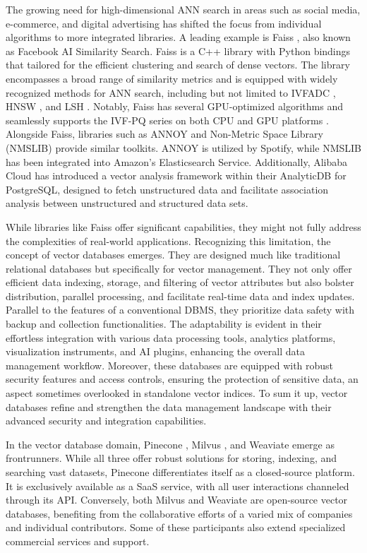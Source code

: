 \documentclass[11pt]{article}
\begin{document}
The growing need for high-dimensional ANN search in areas such as social media, e-commerce, and digital advertising has shifted the focus from individual algorithms to more integrated libraries. A leading example is Faiss \cite{faiss}, also known as Facebook AI Similarity Search.  Faiss is a C++ library with Python bindings that tailored for the efficient clustering and search of dense vectors. The library encompasses a broad range of similarity metrics and is equipped with widely recognized methods for ANN search, including but not limited to IVFADC \cite{DBLP:journals/pami/JegouDS11}, HNSW \cite{DBLP:journals/pami/MalkovY20}, and LSH \cite{e2LSH}. Notably, Faiss has several GPU-optimized algorithms and seamlessly supports the IVF-PQ series on both CPU and GPU platforms \cite{DBLP:journals/tbd/JohnsonDJ21}. Alongside Faiss, libraries such as ANNOY and Non-Metric Space Library (NMSLIB) provide similar toolkits. ANNOY \cite{annoy} is utilized by Spotify, while NMSLIB \cite{nmslib} has been integrated into Amazon's Elasticsearch Service. Additionally, Alibaba Cloud has introduced a vector analysis framework within their AnalyticDB for PostgreSQL, designed to fetch unstructured data and facilitate association analysis between unstructured and structured data sets.

While libraries like Faiss offer significant capabilities, they might not fully address the complexities of real-world applications. Recognizing this limitation, the concept of vector databases emerges. They are designed much like traditional relational databases but specifically for vector management. They not only offer efficient data indexing, storage, and filtering of vector attributes but also bolster distribution, parallel processing, and facilitate real-time data and index updates. Parallel to the features of a conventional DBMS, they prioritize data safety with backup and collection functionalities. The adaptability is evident in their effortless integration with various data processing tools, analytics platforms, visualization instruments, and AI plugins, enhancing the overall data management workflow. Moreover, these databases are equipped with robust security features and access controls, ensuring the protection of sensitive data, an aspect sometimes overlooked in standalone vector indices. To sum it up, vector databases refine and strengthen the data management landscape with their advanced security and integration capabilities. 

In the vector database domain, Pinecone \cite{pinecone}, Milvus \cite{milvus}, and Weaviate \cite{weaviate} emerge as frontrunners. While all three offer robust solutions for storing, indexing, and searching vast datasets, Pinecone differentiates itself as a closed-source platform. It is exclusively available as a SaaS service, with all user interactions channeled through its API. Conversely, both Milvus and Weaviate are open-source vector databases, benefiting from the collaborative efforts of a varied mix of companies and individual contributors. Some of these participants also extend specialized commercial services and support.
\end{document}
